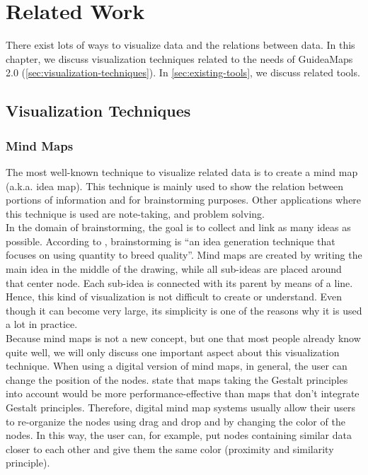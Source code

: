 \chapter{Related Work}\label{ch:related-work}

There exist lots of ways to visualize data and the relations between data. In this chapter, we discuss visualization techniques related to the needs of GuideaMaps 2.0 (\autoref{sec:visualization-techniques}). In \autoref{sec:existing-tools}, we discuss related tools.


\section{Visualization Techniques}\label{sec:visualization-techniques}

\subsection{Mind Maps}\label{sec:mind-maps}
The most well-known technique to visualize related data is to create a mind map (a.k.a. idea map). This technique is mainly used to show the relation between portions of information and for brainstorming purposes. Other applications where this technique is used are note-taking, and problem solving. \citep{knowledgemapsbalaid} \\

In the domain of brainstorming, the goal is to collect and link as many ideas as possible. According to \cite{shih2011brainstorming}, brainstorming is ``an idea generation technique that focuses on using quantity to breed quality''. Mind maps are created by writing the main idea in the middle of the drawing, while all sub-ideas are placed around that center node. Each sub-idea is connected with its parent by means of a line. Hence, this kind of visualization is not difficult to create or understand. Even though it can become very large, its simplicity is one of the reasons why it is used a lot in practice.\\

Because mind maps is not a new concept, but one that most people already know quite well, we will only discuss one important aspect about this visualization technique. When using a digital version of mind maps, in general, the user can change the position of the nodes. \cite{wiegmann-1992} state that maps taking the Gestalt principles \citep{koffka2013principles} into account would be more performance-effective than maps that don't integrate Gestalt principles. Therefore, digital mind map systems usually allow their users to re-organize the nodes using drag and drop and by changing the color of the nodes. In this way, the user can, for example, put nodes containing similar data closer to each other and give them the same color (proximity and similarity principle).



